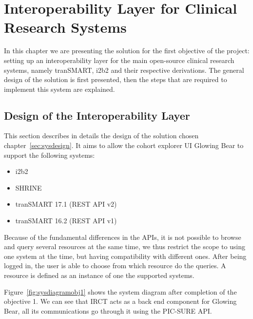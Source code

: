 
\chapter{Interoperability Layer for Clinical Research Systems}

In this chapter we are presenting the solution for the first objective of the project:
setting up an interoperability layer for the main open-source clinical research systems, namely tranSMART, i2b2 and their respective derivations.
The general design of the solution is first presented, then the steps that are required to implement this system are explained.

\section{Design of the Interoperability Layer}

This section describes in details the design of the solution chosen chapter~\ref{sec:sysdesign}.
It aims to allow the cohort explorer UI Glowing Bear to support the following systems:
\begin{itemize}
    \item i2b2
    \item SHRINE 
    \item tranSMART 17.1 (REST API v2)
    \item tranSMART 16.2 (REST API v1)
\end{itemize}

Because of the fundamental differences in the APIs, it is not possible to browse and query several resources at the same time, we thus restrict the scope to using one system at the time, but having compatibility with different ones.
After being logged in, the user is able to choose from which resource do the queries.
A resource is defined as an instance of one the supported systems.

Figure~\ref{fig:sysdiagramobj1} shows the system diagram after completion of the objective 1.
We can see that IRCT acts as a back end component for Glowing Bear, all its communications go through it using the PIC-SURE API.

